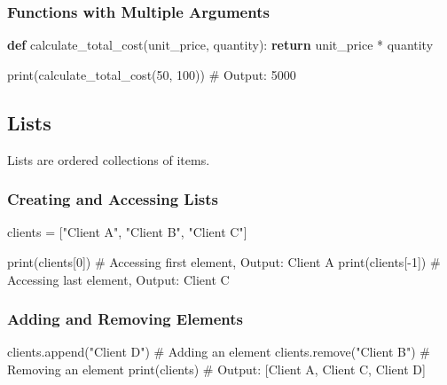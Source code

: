 \documentclass[
  letterpaper,
  DIV=11,
  numbers=noendperiod]{scrreprt}
\newenvironment{Shaded}{\begin{snugshade}}{\end{snugshade}}
\newcommand{\BuiltInTok}[1]{\textcolor[rgb]{0.00,0.23,0.31}{#1}}
\newcommand{\CommentTok}[1]{\textcolor[rgb]{0.37,0.37,0.37}{#1}}
\newcommand{\ControlFlowTok}[1]{\textcolor[rgb]{0.00,0.23,0.31}{\textbf{#1}}}
\newcommand{\DecValTok}[1]{\textcolor[rgb]{0.68,0.00,0.00}{#1}}
\newcommand{\KeywordTok}[1]{\textcolor[rgb]{0.00,0.23,0.31}{\textbf{#1}}}
\newcommand{\NormalTok}[1]{\textcolor[rgb]{0.00,0.23,0.31}{#1}}
\newcommand{\OperatorTok}[1]{\textcolor[rgb]{0.37,0.37,0.37}{#1}}
\newcommand{\StringTok}[1]{\textcolor[rgb]{0.13,0.47,0.30}{#1}}
\begin{document}
\subsubsection{Functions with Multiple
Arguments}\label{functions-with-multiple-arguments}

\begin{Shaded}
\begin{Highlighting}[]
\KeywordTok{def}\NormalTok{ calculate\_total\_cost(unit\_price, quantity):}
    \ControlFlowTok{return}\NormalTok{ unit\_price }\OperatorTok{*}\NormalTok{ quantity}

\BuiltInTok{print}\NormalTok{(calculate\_total\_cost(}\DecValTok{50}\NormalTok{, }\DecValTok{100}\NormalTok{))  }\CommentTok{\# Output: 5000}
\end{Highlighting}
\end{Shaded}

\subsection{Lists}\label{lists}

Lists are ordered collections of items.

\subsubsection{Creating and Accessing
Lists}\label{creating-and-accessing-lists}

\begin{Shaded}
\begin{Highlighting}[]
\NormalTok{clients }\OperatorTok{=}\NormalTok{ [}\StringTok{"Client A"}\NormalTok{, }\StringTok{"Client B"}\NormalTok{, }\StringTok{"Client C"}\NormalTok{]}

\BuiltInTok{print}\NormalTok{(clients[}\DecValTok{0}\NormalTok{])  }\CommentTok{\# Accessing first element, Output: Client A}
\BuiltInTok{print}\NormalTok{(clients[}\OperatorTok{{-}}\DecValTok{1}\NormalTok{]) }\CommentTok{\# Accessing last element, Output: Client C}
\end{Highlighting}
\end{Shaded}

\subsubsection{Adding and Removing
Elements}\label{adding-and-removing-elements}

\begin{Shaded}
\begin{Highlighting}[]
\NormalTok{clients.append(}\StringTok{"Client D"}\NormalTok{)  }\CommentTok{\# Adding an element}
\NormalTok{clients.remove(}\StringTok{"Client B"}\NormalTok{)  }\CommentTok{\# Removing an element}
\BuiltInTok{print}\NormalTok{(clients)  }\CommentTok{\# Output: [\textquotesingle{}Client A\textquotesingle{}, \textquotesingle{}Client C\textquotesingle{}, \textquotesingle{}Client D\textquotesingle{}]}
\end{Highlighting}
\end{Shaded}
\end{document}
